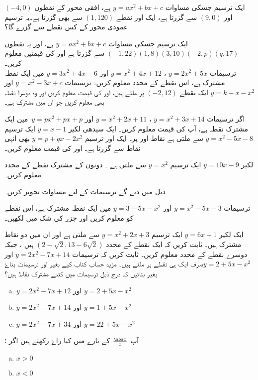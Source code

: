 
ایک ترسیم جسکی مساوات \( y=ax^{2}+bx+c \)  ہے، افقی محور کے نقطوں  \( (-4,0) \) اور \(  (9,0)\)  سے  گزرتا ہے، ایک اور نقطے \(     (1,120)\) سے بھی گزرتا ہے۔یہ ترسیم عمودی محور کے کس نقطے سے گزرے گا؟

ایک ترسیم جسکی مساوات  \( y=ax^{2}+bx+c \)  ہے، اور یہ نقطوں \(     (-1,22)(1,8)(3,10) (-2,p) (q,17)\) سے گزرتا ہے  اور  کی قیمتیں معلوم کریں۔
\\
ترسیمات \( y=2x^{2}+5x\) ، \( y=x^{2}+4x+12\)  اور \(  y=3x^{2}+4x-6 \) میں ایک نقطہ مشترک ہے، اس نقطے کے محدد معلوم کریں۔
ترسیمات  \( y=x^{2}-3x+c\)  اور  \( y=k-x-x^{2} \) ایک نقطے \( (-2,12) \)  پر ملتے ہیں، اور  کی قیمت معلوم کریں اور وہ دوسرا نقطہ بھی معلوم کریں جو ان میں مشترک ہے۔


اگر ترسیمات   \( y=x^{2}+3x+14 \) ،  \( y=x^{2}+2x+11 \)  اور \( y=px^{2}+px+p \)\ مین ایک مشترک نقطہ ہے، آپ  کی قیمت معلوم کریں۔
ایک سیدھی لکیر    \( y=x-1\) ایک ترسیم   \(y=x^{2}-5x-8\)  سے ملتی ہے نقاط  اور  پر۔ ایک اور ترسیم \(   y=p+qx-2x^{2} \)  بھی انہی نقاط سے گزرتا ہے۔  اور  کی قیمت معلوم کریں۔


لکیر \(y=10x-9\)  ایک ترسیم \( y=x^{2}\) سے ملتی ہے ۔ دونون کے مشترک نقطے کے محدد معلوم کریں۔
 
ذیل میں دیے گے ترسیمات کے لیے مساوات تجویز کریں۔

ترسیمات   \(y=x^{2}-5x-3\)  اور  \(y=3-5x-x^{2}\)  میں ایک نقطہ مشترک ہے، اس نقطے کو معلوم کریں اور جزر کی شک میں لکھیں۔
 

ایک لکیر  \(y=6x+1\)  ایک ترسیم \(y=x^{2}+2x+3 \)  سے ملتی ہے اور ان میں دو نقاط مشترک ہیں۔ ثابت کریں کہ ایک نقطے کے محدد \( (2-\sqrt{2},13-6\sqrt{2})\) ہیں ، جبکہ دوسرے نقطے کے محدد معلوم کریں۔
ثابت کریں کہ ترسیمات  \(y=2x^{2}-7x+14 \)  اور \(     y=2+5x-x^{2}\)صرف ایک ہی نقطے پر ملتے ہیں۔ مزید حساب کتاب کیے بغیر  اور ترسیمات بناۓ بغیر بتائیں کہ درج ذیل ترسیمات میں کتنے مشترک نقاط ہیں؟
\begin{enumerate}[a.]
 \item \( y=2x^{2}-7x+12 \) اور \( y=2+5x-x^{2} \)
\item \( y=2x^{2}-7x+14 \) اور \( y=1+5x-x^{2}  \)
\item \( y=2x^{2}-7x+34 \) اور \( y=22+5x-x^{2} \)
\end{enumerate}
آپ  \(\frac{\abs x}{x} \) کے بارے میں کیا راۓ  رکھتے ہیں اگر ؛
\begin{enumerate}[a.]
\item \(x>0  \)
\item \(x<0  \)
 \end{enumerate}
